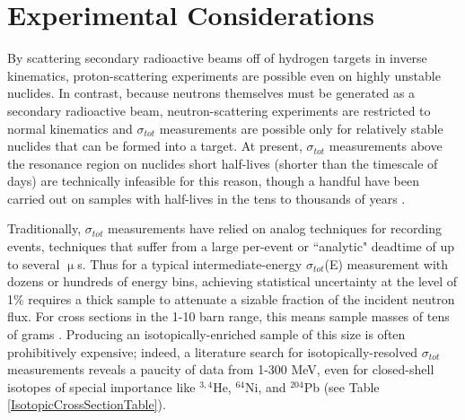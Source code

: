 \documentclass[twocolumn,secnumarabic,amssymb, nobibnotes, aps, prl,
superscriptaddress, nobalancelastpage]{revtex4}
\newcommand{\tots}{\ensuremath{\sigma_{tot}}\,\,}
\newcommand{\totEs}{\ensuremath{\sigma_{tot}}(E)\,\,}
\begin{document}
\section{Experimental Considerations}
By scattering secondary radioactive beams off of hydrogen targets in inverse
kinematics, proton-scattering experiments are possible even on highly unstable
nuclides. In contrast, because neutrons themselves must be generated as a
secondary radioactive beam, neutron-scattering experiments are restricted to
normal kinematics and \tots measurements are possible only for relatively stable
nuclides that can be formed into a target. At present, \tots measurements above
the resonance region on nuclides short half-lives (shorter than the timescale of
days) are technically infeasible for this reason, though a handful have been carried out on
samples with half-lives in the tens to thousands of years \cite{Poenitz1983,
Phillips1980, Foster1971}.

Traditionally, \tots measurements have relied on analog techniques for recording
events, techniques that suffer from a large per-event or ``analytic" deadtime of
up to several $\upmu$s. Thus for a typical intermediate-energy \totEs measurement
with dozens or hundreds of energy bins, achieving statistical uncertainty at the
level of 1\% requires a thick sample to attenuate a sizable fraction of the
incident neutron flux. For cross sections in the 1-10 barn range, this means
sample masses of tens of grams \cite{Finlay1993, Abfalterer2001}.
Producing an isotopically-enriched sample of this size is often
prohibitively expensive; indeed, a literature search for isotopically-resolved
\tots measurements reveals a paucity of data from 1-300 MeV, even for
closed-shell isotopes of special importance like $^{3,4}$He, $^{64}$Ni, and
$^{204}$Pb (see Table \ref{IsotopicCrossSectionTable}).
\end{document}
